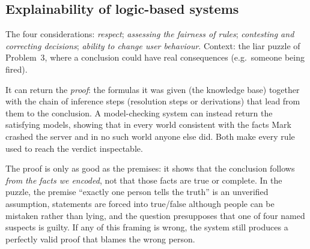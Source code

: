 \subsection{Explainability of logic-based systems}

The four considerations: \emph{respect}; \emph{assessing the fairness of rules}; \emph{contesting and correcting
decisions}; \emph{ability to change user behaviour}. Context: the liar puzzle of Problem~3, where a conclusion could
have real consequences (e.g.\ someone being fired).

\begin{solution}
It can return the \emph{proof}: the formulas it was given (the knowledge base) together with the chain of
inference steps (resolution steps or derivations) that lead from them to the conclusion. A model-checking system can
instead return the satisfying models, showing that in every world consistent with the facts Mark crashed the server
and in no such world anyone else did. Both make every rule used to reach the verdict inspectable.
\end{solution}

\begin{solution}
The proof is only as good as the premises: it shows that the conclusion follows \emph{from the facts we encoded},
not that those facts are true or complete. In the puzzle, the premise ``exactly one person tells the truth'' is an
unverified assumption, statements are forced into true/false although people can be mistaken rather than lying, and
the question presupposes that one of four named suspects is guilty. If any of this framing is wrong, the system
still produces a perfectly valid proof that blames the wrong person.
\end{solution}

